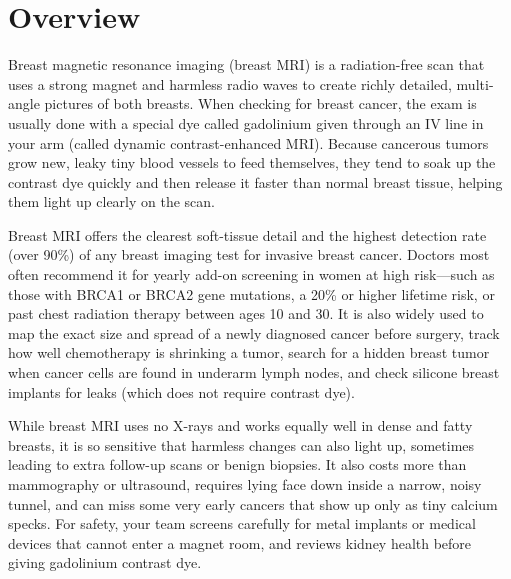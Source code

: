 \label{ch:infographic-breast-mri}

\section{Overview}

Breast magnetic resonance imaging (breast MRI) is a radiation-free scan that uses a strong magnet and harmless radio waves to create richly detailed, multi-angle pictures of both breasts. When checking for breast cancer, the exam is usually done with a special dye called gadolinium given through an IV line in your arm (called dynamic contrast-enhanced MRI). Because cancerous tumors grow new, leaky tiny blood vessels to feed themselves, they tend to soak up the contrast dye quickly and then release it faster than normal breast tissue, helping them light up clearly on the scan.

Breast MRI offers the clearest soft-tissue detail and the highest detection rate (over 90\%) of any breast imaging test for invasive breast cancer. Doctors most often recommend it for yearly add-on screening in women at high risk---such as those with BRCA1 or BRCA2 gene mutations, a 20\% or higher lifetime risk, or past chest radiation therapy between ages 10 and 30. It is also widely used to map the exact size and spread of a newly diagnosed cancer before surgery, track how well chemotherapy is shrinking a tumor, search for a hidden breast tumor when cancer cells are found in underarm lymph nodes, and check silicone breast implants for leaks (which does not require contrast dye).

While breast MRI uses no X-rays and works equally well in dense and fatty breasts, it is so sensitive that harmless changes can also light up, sometimes leading to extra follow-up scans or benign biopsies. It also costs more than mammography or ultrasound, requires lying face down inside a narrow, noisy tunnel, and can miss some very early cancers that show up only as tiny calcium specks. For safety, your team screens carefully for metal implants or medical devices that cannot enter a magnet room, and reviews kidney health before giving gadolinium contrast dye.

